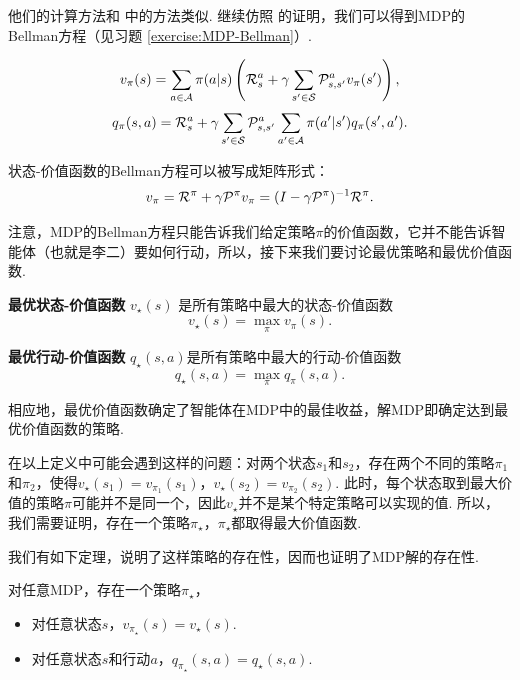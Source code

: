 他们的计算方法和 中的方法类似. 继续仿照 的证明，我们可以得到MDP的Bellman方程（见习题 \ref{exercise:MDP-Bellman}）.

\begin{theorem}[Bellman方程]\label{thm:MDP-Bellman}
\[v_\pi(s) = \sum_{a\in \mathcal A}\pi(a|s)\left(\mathcal R_s^a + \gamma \sum_{s'\in \mathcal S}\mathcal P_{s,s'}^av_\pi(s')\right),\]
\[q_\pi(s,a) = \mathcal R_s^a + \gamma \sum_{s'\in \mathcal S}\mathcal P_{s,s'}^a \sum_{a'\in \mathcal A}\pi(a'|s')q_\pi(s',a').\]
\end{theorem}

状态-价值函数的Bellman方程可以被写成矩阵形式：
\[v_\pi = \mathcal R^\pi + \gamma \mathcal P^\pi v_\pi = (I-\gamma \mathcal P^\pi)^{-1}\mathcal R^\pi.\]

注意，MDP的Bellman方程只能告诉我们给定策略$\pi$的价值函数，它并不能告诉智能体（也就是李二）要如何行动，所以，接下来我们要讨论最优策略和最优价值函数. 

\begin{definition}[最优价值函数]
\textbf{最优状态-价值函数} $v_\star(s)$ 是所有策略中最大的状态-价值函数
    \[v_\star(s) = \max_\pi v_\pi(s).\]

\textbf{最优行动-价值函数} $q_\star(s,a)$是所有策略中最大的行动-价值函数
    \[q_\star(s,a) = \max_\pi q_\pi(s,a).\]
\end{definition}

相应地，最优价值函数确定了智能体在MDP中的最佳收益，解MDP即确定达到最优价值函数的策略. 

在以上定义中可能会遇到这样的问题：对两个状态$s_1$和$s_2$，存在两个不同的策略$\pi_1$和$\pi_2$，使得$v_\star(s_1)=v_{\pi_1}(s_1)$，$v_\star(s_2)=v_{\pi_2}(s_2)$. 此时，每个状态取到最大价值的策略$\pi$可能并不是同一个，因此$v_\star$并不是某个特定策略可以实现的值. 所以，我们需要证明，存在一个策略$\pi_\star$，$\pi_\star$都取得最大价值函数. 

我们有如下定理，说明了这样策略的存在性，因而也证明了MDP解的存在性. 
\begin{theorem}[MDP解的存在性]\label{thm:MDP-existence}
对任意MDP，存在一个策略$\pi_\star$，
\begin{itemize}
    \item 对任意状态$s$，$v_{\pi_\star}(s) = v_\star(s)$.
    \item 对任意状态$s$和行动$a$，$q_{\pi_\star}(s,a)=q_\star(s,a)$.
\end{itemize}
\end{theorem}

